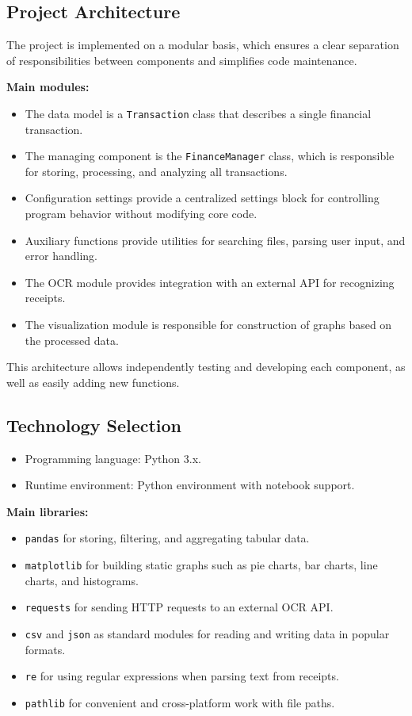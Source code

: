 \documentclass[conference]{IEEEtran}
\begin{document}
\subsection{Project Architecture}
The project is implemented on a modular basis, which ensures a clear separation of responsibilities between components and simplifies code maintenance.

\textbf{Main modules:}
\begin{itemize}
\item The data model is a \texttt{Transaction} class that describes a single financial transaction.
\item The managing component is the \texttt{FinanceManager} class, which is responsible for storing, processing, and analyzing all transactions.
\item Configuration settings provide a centralized settings block for controlling program behavior without modifying core code.
\item Auxiliary functions provide utilities for searching files, parsing user input, and error handling.
\item The OCR module provides integration with an external API for recognizing receipts.
\item The visualization module is responsible for construction of graphs based on the processed data.
\end{itemize}

This architecture allows independently testing and developing each component, as well as easily adding new functions.

\subsection{Technology Selection}
\begin{itemize}
\item Programming language: Python 3.x.
\item Runtime environment: Python environment with notebook support.
\end{itemize}

\textbf{Main libraries:}
\begin{itemize}
\item \texttt{pandas} for storing, filtering, and aggregating tabular data.
\item \texttt{matplotlib} for building static graphs such as pie charts, bar charts, line charts, and histograms.
\item \texttt{requests} for sending HTTP requests to an external OCR API.
\item \texttt{csv} and \texttt{json} as standard modules for reading and writing data in popular formats.
\item \texttt{re} for using regular expressions when parsing text from receipts.
\item \texttt{pathlib} for convenient and cross-platform work with file paths.
\end{itemize}
\end{document}
